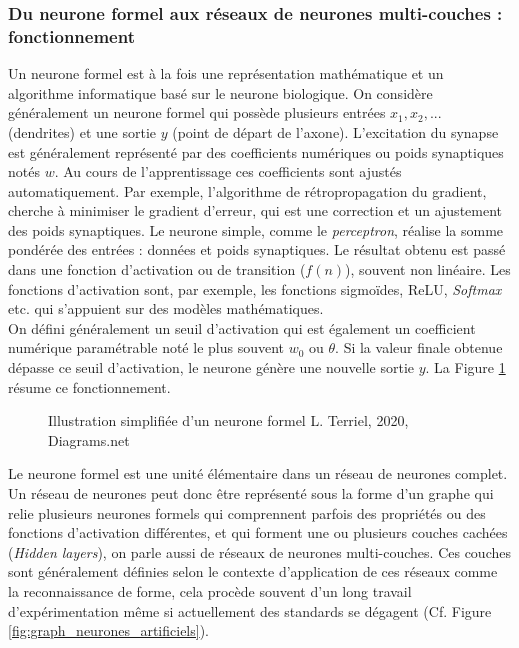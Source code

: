 \subsubsection{Du neurone formel aux réseaux de neurones multi-couches : fonctionnement}  

Un neurone formel est à la fois une représentation mathématique et un algorithme informatique basé sur le neurone biologique. On considère généralement un neurone formel qui possède plusieurs entrées $x_1, x_2, ...$ (dendrites) et une sortie $y$ (point de départ de l'axone). L'excitation du synapse est généralement représenté par des coefficients numériques ou poids synaptiques notés $w$. Au cours de l'apprentissage ces coefficients sont ajustés automatiquement. Par exemple, l'algorithme de rétropropagation du gradient, cherche à minimiser le gradient d'erreur, qui est une correction et un ajustement des poids synaptiques. Le neurone simple, comme le \textit{perceptron}, réalise la somme pondérée des entrées : données et poids synaptiques. Le résultat obtenu est passé dans une fonction d'activation ou de transition ($f(n)$), souvent non linéaire. Les fonctions d'activation sont, par exemple, les fonctions sigmoïdes, ReLU, \textit{Softmax} etc. qui s'appuient sur des modèles mathématiques.\\ 

On défini généralement un seuil d'activation qui est également un coefficient numérique paramétrable noté le plus souvent $w_0$ ou $\theta$. Si la valeur finale obtenue dépasse ce seuil d'activation, le neurone génère une nouvelle sortie $y$. La Figure \ref{fig:neurone_formel} résume ce fonctionnement.
\newpage
\begin{figure}[h]
    \centering
    \centerline{}
    \caption{Illustration simplifiée d'un neurone formel  \textcopyright L. Terriel, 2020, Diagrams.net}
    \label{fig:neurone_formel}
\end{figure}

Le neurone formel est une unité élémentaire dans un réseau de neurones complet. Un réseau de neurones peut donc être représenté sous la forme d'un graphe qui relie plusieurs neurones formels qui comprennent parfois des propriétés ou des fonctions d'activation différentes, et qui forment une ou plusieurs couches cachées (\textit{Hidden layers}), on parle aussi de réseaux de neurones multi-couches. Ces couches sont généralement définies selon le contexte d'application de ces réseaux comme la reconnaissance de forme, cela procède souvent d'un long travail d'expérimentation même si actuellement des standards se dégagent (Cf. Figure \ref{fig:graph_neurones_artificiels}).\\

